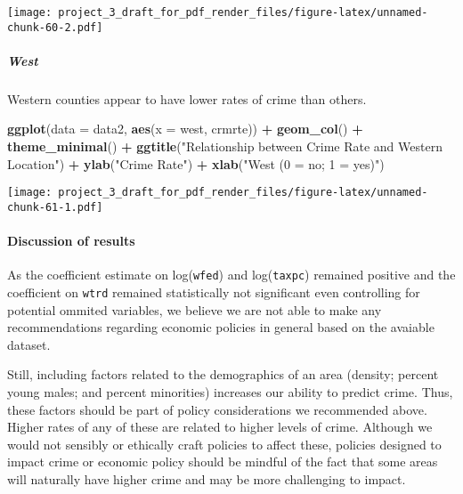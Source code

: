 \documentclass[]{article}
\newenvironment{Shaded}{\begin{snugshade}}{\end{snugshade}}
\newcommand{\DataTypeTok}[1]{\textcolor[rgb]{0.13,0.29,0.53}{#1}}
\newcommand{\KeywordTok}[1]{\textcolor[rgb]{0.13,0.29,0.53}{\textbf{#1}}}
\newcommand{\NormalTok}[1]{#1}
\newcommand{\OperatorTok}[1]{\textcolor[rgb]{0.81,0.36,0.00}{\textbf{#1}}}
\newcommand{\StringTok}[1]{\textcolor[rgb]{0.31,0.60,0.02}{#1}}
\let\oldparagraph\paragraph
\renewcommand{\paragraph}[1]{\oldparagraph{#1}\mbox{}}
\let\oldsubparagraph\subparagraph
\renewcommand{\subparagraph}[1]{\oldsubparagraph{#1}\mbox{}}
\begin{document}
\texttt{[image: project\_3\_draft\_for\_pdf\_render\_files/figure-latex/unnamed-chunk-60-2.pdf]}

\hypertarget{west}{%
\subparagraph{West}\label{west}}

Western counties appear to have lower rates of crime than others.

\begin{Shaded}
\begin{Highlighting}[]
\KeywordTok{ggplot}\NormalTok{(}\DataTypeTok{data =}\NormalTok{ data2, }\KeywordTok{aes}\NormalTok{(}\DataTypeTok{x =}\NormalTok{ west, crmrte)) }\OperatorTok{+}
\StringTok{  }\KeywordTok{geom_col}\NormalTok{() }\OperatorTok{+}
\StringTok{  }\KeywordTok{theme_minimal}\NormalTok{() }\OperatorTok{+}
\StringTok{  }\KeywordTok{ggtitle}\NormalTok{(}\StringTok{"Relationship between Crime Rate and Western Location"}\NormalTok{) }\OperatorTok{+}\StringTok{ }
\StringTok{  }\KeywordTok{ylab}\NormalTok{(}\StringTok{"Crime Rate"}\NormalTok{) }\OperatorTok{+}\StringTok{ }\KeywordTok{xlab}\NormalTok{(}\StringTok{"West (0 = no; 1 = yes)"}\NormalTok{) }
\end{Highlighting}
\end{Shaded}

\texttt{[image: project\_3\_draft\_for\_pdf\_render\_files/figure-latex/unnamed-chunk-61-1.pdf]}

\hypertarget{discussion-of-results}{%
\paragraph{Discussion of results}\label{discussion-of-results}}

As the coefficient estimate on log(\texttt{wfed}) and
log(\texttt{taxpc}) remained positive and the coefficient on
\texttt{wtrd} remained statistically not significant even controlling
for potential ommited variables, we believe we are not able to make any
recommendations regarding economic policies in general based on the
avaiable dataset.

Still, including factors related to the demographics of an area
(density; percent young males; and percent minorities) increases our
ability to predict crime. Thus, these factors should be part of policy
considerations we recommended above. Higher rates of any of these are
related to higher levels of crime. Although we would not sensibly or
ethically craft policies to affect these, policies designed to impact
crime or economic policy should be mindful of the fact that some areas
will naturally have higher crime and may be more challenging to impact.
\end{document}
